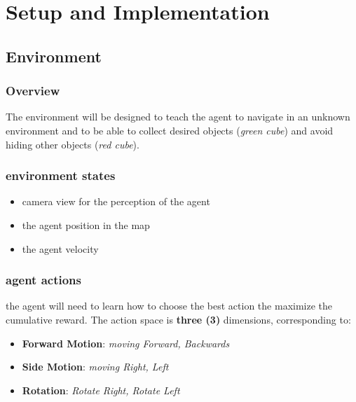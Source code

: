
\chapter{Setup and Implementation}\label{chapter:Setup and Implementation}



\section{Environment}

\subsection{Overview} 
The environment will be designed to teach the agent to navigate in an unknown environment and to be able to collect desired objects (\textit{green cube}) and avoid hiding other objects (\textit{red cube}).

\subsection{environment states}

\begin{itemize}
    \item camera view for the perception of the agent
    \item the agent position in the map
    \item the agent velocity
\end{itemize}

\subsection{agent actions}
the agent will need to learn how to choose the best action the maximize the cumulative reward.
The action space is \textbf{three (3)} dimensions, corresponding to:
\begin{itemize}
    \item \textbf{Forward Motion}: \textit{moving Forward, Backwards}
    \item \textbf{Side Motion}: \textit{moving Right, Left}
    \item \textbf{Rotation}: \textit{Rotate Right, Rotate Left}
\end{itemize}

